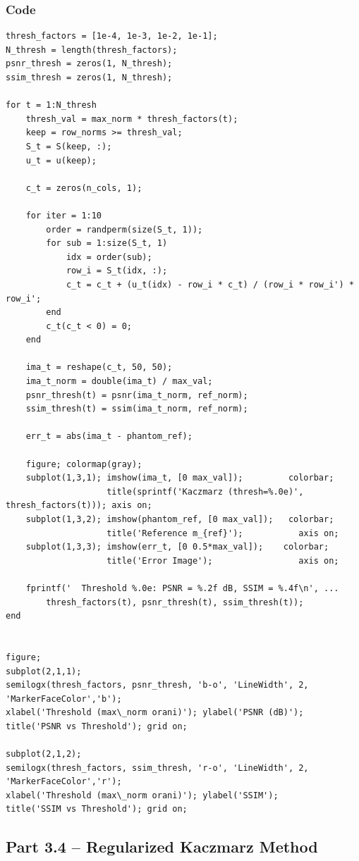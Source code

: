 \documentclass[12pt,a4paper]{article}
\begin{document}
\subsubsection*{Code}
\begin{lstlisting}
thresh_factors = [1e-4, 1e-3, 1e-2, 1e-1];
N_thresh = length(thresh_factors);
psnr_thresh = zeros(1, N_thresh);
ssim_thresh = zeros(1, N_thresh);

for t = 1:N_thresh
    thresh_val = max_norm * thresh_factors(t);
    keep = row_norms >= thresh_val;
    S_t = S(keep, :);
    u_t = u(keep);

    c_t = zeros(n_cols, 1);

    for iter = 1:10
        order = randperm(size(S_t, 1));
        for sub = 1:size(S_t, 1)
            idx = order(sub);
            row_i = S_t(idx, :);
            c_t = c_t + (u_t(idx) - row_i * c_t) / (row_i * row_i') * row_i';
        end
        c_t(c_t < 0) = 0;
    end

    ima_t = reshape(c_t, 50, 50);
    ima_t_norm = double(ima_t) / max_val;
    psnr_thresh(t) = psnr(ima_t_norm, ref_norm);
    ssim_thresh(t) = ssim(ima_t_norm, ref_norm);

    err_t = abs(ima_t - phantom_ref);

    figure; colormap(gray);
    subplot(1,3,1); imshow(ima_t, [0 max_val]);         colorbar;
                    title(sprintf('Kaczmarz (thresh=%.0e)', thresh_factors(t))); axis on;
    subplot(1,3,2); imshow(phantom_ref, [0 max_val]);   colorbar;
                    title('Reference m_{ref}');           axis on;
    subplot(1,3,3); imshow(err_t, [0 0.5*max_val]);    colorbar;
                    title('Error Image');                 axis on;

    fprintf('  Threshold %.0e: PSNR = %.2f dB, SSIM = %.4f\n', ...
        thresh_factors(t), psnr_thresh(t), ssim_thresh(t));
end


figure;
subplot(2,1,1);
semilogx(thresh_factors, psnr_thresh, 'b-o', 'LineWidth', 2, 'MarkerFaceColor','b');
xlabel('Threshold (max\_norm orani)'); ylabel('PSNR (dB)');
title('PSNR vs Threshold'); grid on;

subplot(2,1,2);
semilogx(thresh_factors, ssim_thresh, 'r-o', 'LineWidth', 2, 'MarkerFaceColor','r');
xlabel('Threshold (max\_norm orani)'); ylabel('SSIM');
title('SSIM vs Threshold'); grid on;
\end{lstlisting}

\subsection{Part 3.4 -- Regularized Kaczmarz Method}
\end{document}
